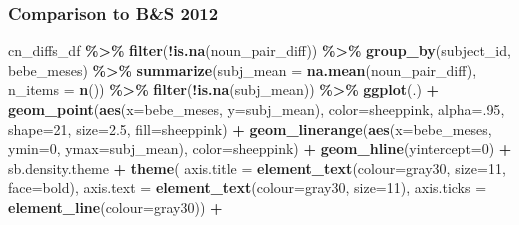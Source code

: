 \documentclass[
  doc,floatsintext]{apa6}
\newenvironment{Shaded}{\begin{snugshade}}{\end{snugshade}}
\newcommand{\AttributeTok}[1]{\textcolor[rgb]{0.13,0.29,0.53}{#1}}
\newcommand{\DecValTok}[1]{\textcolor[rgb]{0.00,0.00,0.81}{#1}}
\newcommand{\FloatTok}[1]{\textcolor[rgb]{0.00,0.00,0.81}{#1}}
\newcommand{\FunctionTok}[1]{\textcolor[rgb]{0.13,0.29,0.53}{\textbf{#1}}}
\newcommand{\NormalTok}[1]{#1}
\newcommand{\SpecialCharTok}[1]{\textcolor[rgb]{0.81,0.36,0.00}{\textbf{#1}}}
\newcommand{\StringTok}[1]{\textcolor[rgb]{0.31,0.60,0.02}{#1}}
\begin{document}
\subsubsection{Comparison to B\&S 2012}\label{comparison-to-bs-2012}

\begin{Shaded}
\begin{Highlighting}[]
\NormalTok{cn\_diffs\_df }\SpecialCharTok{\%\textgreater{}\%} 
  \FunctionTok{filter}\NormalTok{(}\SpecialCharTok{!}\FunctionTok{is.na}\NormalTok{(noun\_pair\_diff)) }\SpecialCharTok{\%\textgreater{}\%}
  \FunctionTok{group\_by}\NormalTok{(subject\_id, bebe\_meses) }\SpecialCharTok{\%\textgreater{}\%}
  \FunctionTok{summarize}\NormalTok{(}\AttributeTok{subj\_mean =} \FunctionTok{na.mean}\NormalTok{(noun\_pair\_diff),}
            \AttributeTok{n\_items =} \FunctionTok{n}\NormalTok{()) }\SpecialCharTok{\%\textgreater{}\%}
  \FunctionTok{filter}\NormalTok{(}\SpecialCharTok{!}\FunctionTok{is.na}\NormalTok{(subj\_mean)) }\SpecialCharTok{\%\textgreater{}\%}
\FunctionTok{ggplot}\NormalTok{(.) }\SpecialCharTok{+}
  \FunctionTok{geom\_point}\NormalTok{(}\FunctionTok{aes}\NormalTok{(}\AttributeTok{x=}\NormalTok{bebe\_meses, }\AttributeTok{y=}\NormalTok{subj\_mean), }
             \AttributeTok{color=}\NormalTok{sheeppink, }\AttributeTok{alpha=}\NormalTok{.}\DecValTok{95}\NormalTok{, }\AttributeTok{shape=}\DecValTok{21}\NormalTok{, }\AttributeTok{size=}\FloatTok{2.5}\NormalTok{, }
             \AttributeTok{fill=}\NormalTok{sheeppink) }\SpecialCharTok{+} 
  \FunctionTok{geom\_linerange}\NormalTok{(}\FunctionTok{aes}\NormalTok{(}\AttributeTok{x=}\NormalTok{bebe\_meses, }
                     \AttributeTok{ymin=}\DecValTok{0}\NormalTok{, }\AttributeTok{ymax=}\NormalTok{subj\_mean), }
                 \AttributeTok{color=}\NormalTok{sheeppink) }\SpecialCharTok{+}
  \FunctionTok{geom\_hline}\NormalTok{(}\AttributeTok{yintercept=}\DecValTok{0}\NormalTok{) }\SpecialCharTok{+}
\NormalTok{  sb.density.theme }\SpecialCharTok{+}
  \FunctionTok{theme}\NormalTok{(}
    \AttributeTok{axis.title =} \FunctionTok{element\_text}\NormalTok{(}\AttributeTok{colour=}\StringTok{\textquotesingle{}gray30\textquotesingle{}}\NormalTok{, }\AttributeTok{size=}\DecValTok{11}\NormalTok{, }\AttributeTok{face=}\StringTok{\textquotesingle{}bold\textquotesingle{}}\NormalTok{),}
        \AttributeTok{axis.text =} \FunctionTok{element\_text}\NormalTok{(}\AttributeTok{colour=}\StringTok{\textquotesingle{}gray30\textquotesingle{}}\NormalTok{, }\AttributeTok{size=}\DecValTok{11}\NormalTok{),}
        \AttributeTok{axis.ticks =} \FunctionTok{element\_line}\NormalTok{(}\AttributeTok{colour=}\StringTok{\textquotesingle{}gray30\textquotesingle{}}\NormalTok{)) }\SpecialCharTok{+}

\end{Highlighting}
\end{Shaded}
\end{document}
